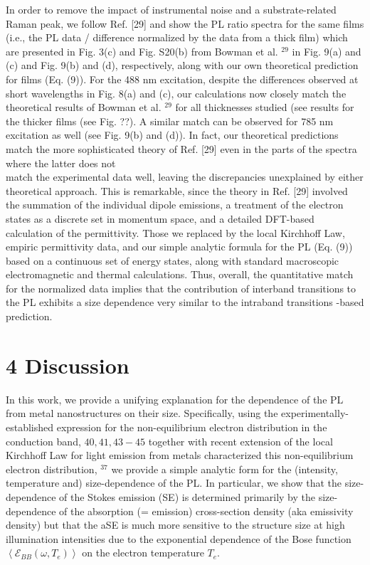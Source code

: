 \documentclass[10pt]{article}
\begin{document}
In order to remove the impact of instrumental noise and a substrate-related Raman peak, we follow Ref. [29] and show the PL ratio spectra for the same films (i.e., the PL data / difference normalized by the data from a thick film) which are presented in Fig. 3(c) and Fig. S20(b) from Bowman et al. ${ }^{29}$ in Fig. 9(a) and (c) and Fig. 9(b) and (d), respectively, along with our own theoretical prediction for films (Eq. (9)). For the 488 nm excitation, despite the differences observed at short wavelengths in Fig. 8(a) and (c), our calculations now closely match the theoretical results of Bowman et al. ${ }^{29}$ for all thicknesses studied (see results for the thicker films (see Fig. ??). A similar match can be observed for 785 nm excitation as well (see Fig. 9(b) and (d)). In fact, our theoretical predictions match the more sophisticated theory of Ref. [29] even in the parts of the spectra where the latter does not\\[0pt]
match the experimental data well, leaving the discrepancies unexplained by either theoretical approach. This is remarkable, since the theory in Ref. [29] involved the summation of the individual dipole emissions, a treatment of the electron states as a discrete set in momentum space, and a detailed DFT-based calculation of the permittivity. Those we replaced by the local Kirchhoff Law, empiric permittivity data, and our simple analytic formula for the PL (Eq. (9)) based on a continuous set of energy states, along with standard macroscopic electromagnetic and thermal calculations. Thus, overall, the quantitative match for the normalized data implies that the contribution of interband transitions to the PL exhibits a size dependence very similar to the intraband transitions -based prediction.

\section*{4 Discussion}
In this work, we provide a unifying explanation for the dependence of the PL from metal nanostructures on their size. Specifically, using the experimentally-established expression for the non-equilibrium electron distribution in the conduction band, $40,41,43-45$ together with recent extension of the local Kirchhoff Law for light emission from metals characterized this non-equilibrium electron distribution, ${ }^{37}$ we provide a simple analytic form for the (intensity, temperature and) size-dependence of the PL. In particular, we show that the size-dependence of the Stokes emission (SE) is determined primarily by the size-dependence of the absorption (= emission) cross-section density (aka emissivity density) but that the aSE is much more sensitive to the structure size at high illumination intensities due to the exponential dependence of the Bose function $\left\langle\mathcal{E}_{B B}\left(\omega, T_{e}\right)\right\rangle$ on the electron temperature $T_{e}$.
\end{document}
